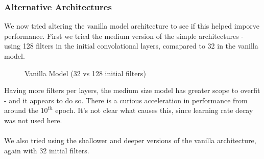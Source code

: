 \documentclass[11pt]{article} %
\theoremstyle{plain}
\theoremstyle{definition}
\begin{document}
\subsubsection{Alternative Architectures}
We now tried altering the vanilla model architecture to see if this helped imporve performance. First we tried the medium version of the simple architectures - using 128 filters in the initial convolational layers, comapared to 32 in the vanilla model.
\begin{figure}[!ht]
\centering
{}
\newline
{}
\caption{Vanilla Model (32 vs 128 initial filters)}
\label{fig:vanilla_medium}
\end{figure}
\FloatBarrier
\noindent
Having more filters per layers, the medium size model has greater scope to overfit - and it appears to do so. There is a curious acceleration in performance from around the \(10^{th}\) epoch. It's not clear what causes this, since learning rate decay was not used here.
\\
\\
\noindent
We also tried using the shallower and deeper versions of the vanilla architecture, again with 32 initial filters.
\end{document}
